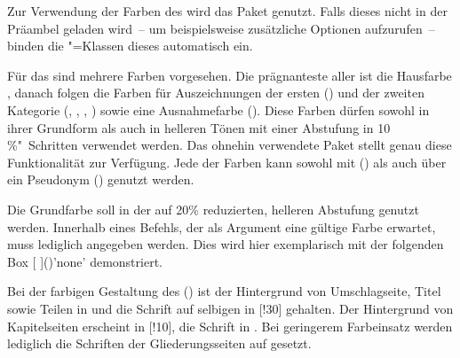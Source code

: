\begin{Bundle*}{}
Zur Verwendung der Farben des \CDs wird das Paket  
genutzt. Falls dieses nicht in der Präambel geladen wird~-- um beispielsweise 
zusätzliche Optionen aufzurufen~-- binden die \TUDScript"=Klassen dieses 
automatisch ein.

Für das \CD sind mehrere Farben vorgesehen. Die prägnanteste aller ist die 
Hausfarbe , danach folgen die Farben für Auszeichnungen der ersten
() und der zweiten Kategorie (, , 
, ) sowie eine Ausnahmefarbe (). 
Diese Farben dürfen sowohl in ihrer Grundform als auch in helleren Tönen mit 
einer Abstufung in 10\,\%"~Schritten verwendet werden. Das ohnehin verwendete 
Paket  stellt genau diese Funktionalität zur Verfügung. Jede 
der Farben kann sowohl mit () als auch über ein 
Pseudonym () genutzt werden.
%
\begin{Example*}
Die Grundfarbe  soll in der auf 20\% reduzierten, helleren 
Abstufung genutzt werden. Innerhalb eines Befehls, der als Argument eine 
gültige Farbe erwartet, muss lediglich  angegeben werden. 
Dies wird hier exemplarisch mit der folgenden \colorbox{HKS44!20}{%
  Box [%
  ]()'none'%
} demonstriert.
\end{Example*}
%
Bei der farbigen Gestaltung des \CDs () ist der Hintergrund 
von Umschlagseite, Titel sowie Teilen in  und die Schrift auf 
selbigen in [!30] gehalten. Der Hintergrund von Kapitelseiten 
erscheint in [!10], die Schrift in . Bei geringerem 
Farbeinsatz werden lediglich die Schriften der Gliederungsseiten auf 
 gesetzt.


\end{Bundle*}
